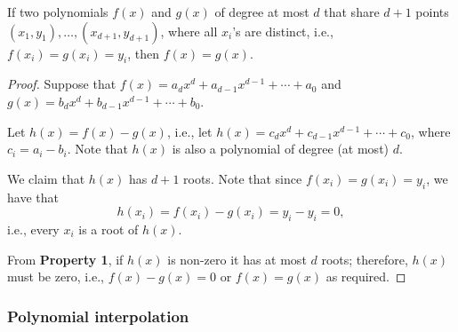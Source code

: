 \begin{frame}
  \begin{lemma}
    If two polynomials $f(x)$ and $g(x)$ of degree at most $d$ that
    share $d+1$ points $(x_1,y_1),\ldots,(x_{d+1},y_{d+1})$, where all
    $x_i$'s are distinct, i.e., $f(x_i)=g(x_i)=y_i$, then $f(x)=g(x)$.
  \end{lemma}
  \begin{proof}
    {\small

      Suppose that $f(x)=a_dx^d+a_{d-1}x^{d-1}+\cdots+a_0$ and
      $g(x)=b_dx^d+b_{d-1}x^{d-1}+\cdots+b_0$.
      
      Let $h(x)=f(x)-g(x)$, i.e., let
      $h(x)=c_dx^d+c_{d-1}x^{d-1}+\cdots+c_0$, where $c_i=a_i-b_i$.
      Note that $h(x)$ is also a polynomial of degree (at most) $d$.

      We claim that $h(x)$ has $d+1$ roots.  Note that since
      $f(x_i)=g(x_i)=y_i$, we have that
      \[
      h(x_i)=f(x_i)-g(x_i)=y_i-y_i=0,
      \]
      i.e., every $x_i$ is a root of $h(x)$.

      From {\bf Property 1}, if $h(x)$ is non-zero it has at most $d$
      roots; therefore, $h(x)$ must be zero, i.e., $f(x)-g(x)=0$ or
      $f(x)=g(x)$ as required.
    }
  \end{proof}
  
\end{frame}

\begin{frame}
  \frametitle{Polynomial interpolation}
\end{frame}
